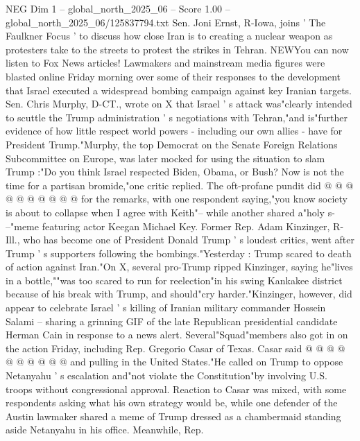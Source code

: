 \begin{textsample}{NEG Dim 1 – global\_north\_2025\_06 – Score 1.00 – global\_north\_2025\_06/125837794.txt}  \label{ex:f1_neg_141}
Sen.
Joni Ernst, R-Iowa, joins ' The Faulkner Focus ' to discuss how close Iran is to creating a nuclear weapon as protesters take to the streets to protest the strikes in Tehran.
NEWYou can now listen to Fox News articles!
Lawmakers and mainstream media figures were blasted online Friday morning over some of their responses to the development that Israel executed a widespread bombing campaign against key Iranian targets.
Sen.
Chris Murphy, D-CT., wrote on X that Israel ' s attack was"clearly intended to scuttle the Trump administration ' s negotiations with Tehran,"and is"further evidence of how little respect world powers - including our own allies - have for President Trump."Murphy, the top Democrat on the Senate Foreign Relations Subcommittee on Europe, was later mocked for using the situation to slam Trump :"Do you think Israel respected Biden, Obama, or Bush?
Now is not the time for a partisan bromide,"one critic replied.
The oft-profane pundit did @ @ @ @ @ @ @ @ @ @ for the remarks, with one respondent saying,"you know society is about to collapse when I agree with Keith"-- while another shared a"holy s- --"meme featuring actor Keegan Michael Key.
Former Rep.
Adam Kinzinger, R-Ill., who has become one of President Donald Trump ' s loudest critics, went after Trump ' s supporters following the bombings."Yesterday : Trump scared to death of action against Iran."On X, several pro-Trump ripped Kinzinger, saying he"lives in a bottle,""was too scared to run for reelection"in his swing Kankakee district because of his break with Trump, and should"cry harder."Kinzinger, however, did appear to celebrate Israel ' s killing of Iranian military commander Hossein Salami -- sharing a grinning GIF of the late Republican presidential candidate Herman Cain in response to a news alert.
Several"Squad"members also got in on the action Friday, including Rep.
Gregorio Casar of Texas.
Casar said @ @ @ @ @ @ @ @ @ @ and pulling in the United States."He called on Trump to oppose Netanyahu ' s escalation and"not violate the Constitution"by involving U.S. troops without congressional approval.
Reaction to Casar was mixed, with some respondents asking what his own strategy would be, while one defender of the Austin lawmaker shared a meme of Trump dressed as a chambermaid standing aside Netanyahu in his office.
Meanwhile, Rep.

\end{textsample}
